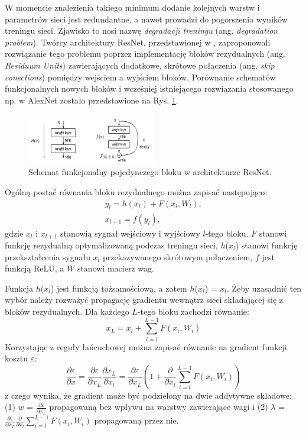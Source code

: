 W momencie znalezienia takiego minimum dodanie kolejnych warstw i parametrów sieci jest redundantne, a nawet prowadzi do pogorszenia wyników treningu sieci. Zjawisko to nosi nazwę \textit{degradacji treningu} (ang. \textit{degradation problem}). Twórcy architektury ResNet, przedstawionej w \cite{ResNet}, zaproponowali rozwiązanie tego problemu poprzez implementację bloków rezydualnych (ang. \textit{Residuum Units}) zawierających dodatkowe, skrótowe połączenia (ang. \textit{skip conections}) pomiędzy wejściem a wyjściem bloków. Porównanie schematów funkcjonalnych nowych bloków i wcześniej istniejącego rozwiązania stosowanego np. w AlexNet zostało przedstawione na Rys. \ref{ResNetBlock}.
\begin{figure}[h!]
	\centering
	\includegraphics[width=0.5\textwidth]{figures/ResidualBlock.jpg}
	\caption{Schemat funkcjonalny pojedynczego bloku w architekturze ResNet.}
	\label{ResNetBlock}
\end{figure} 

Ogólną postać równania bloku rezydualnego można zapisać następująco:
\begin{equation}
\begin{split}
y_l = h(x_l) + F(x_l, W_l),\\
x_{l+1} = f(y_l),
\end{split}
\end{equation}
gdzie $x_l$ i $x_{l+1}$ stanowią sygnał wejściowy i wyjściowy $l$-tego bloku. $F$ stanowi funkcję rezydualną optymalizowaną podczas treningu sieci, $h$($x_l$) stanowi funkcję przekształcenia sygnału $x_l$ przekazywanego skrótowym połączeniem, $f$ jest funkcją ReLU, a $W$ stanowi macierz wag.

Funkcja $h$($x_l$) jest funkcją tożsamościową, a zatem $h$($x_l$) = $x_l$. Żeby uzasadnić ten wybór należy rozważyć propagację gradientu wewnątrz sieci składającej się z bloków rezydualnych. Dla każdego $L$-tego bloku zachodzi równanie:
\begin{equation}
x_L = x_l + \sum_{i=l}^{L-1}F(x_i, W_i)
\end{equation}
Korzystając z reguły łańcuchowej można zapisać równanie na gradient funkcji kosztu $\varepsilon$:
\begin{equation}
\label{gradResBlock}
\frac{\partial \varepsilon}{\partial x} =  \frac{\partial \varepsilon}{\partial x_L} \frac{\partial x_L}{\partial x_l} =  \frac{\partial \varepsilon}{\partial x_L}\left (1 +   \frac{\partial }{\partial x_l}\sum_{i=l}^{L-1}F(x_i, W_i) \right )
\end{equation}
z czego wynika, że gradient może być podzielony na dwie addytywne składowe: (1) $w$ = $\frac{\partial \varepsilon}{\partial x_L}$ propagowaną bez wpływu na warstwy zawierające wagi i (2) $\lambda$ = $\frac{\partial \varepsilon}{\partial x_L}\frac{\partial }{\partial x_l}\sum_{i=l}^{L-1}F(x_i, W_i)$ propagowaną przez nie.

